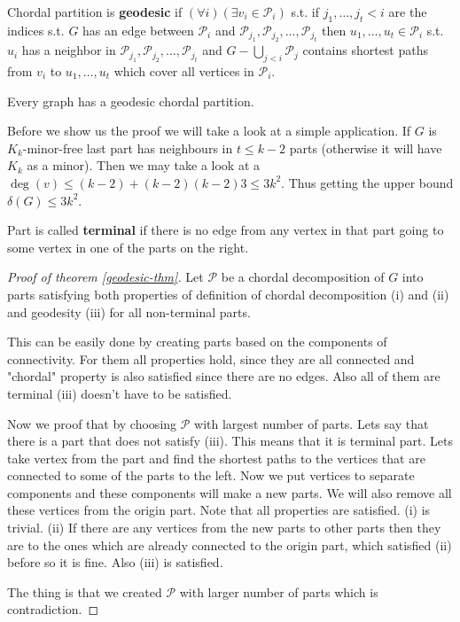 \begin{defn}
	Chordal partition is \textbf{geodesic} if $(\forall i) (\exists v_{i} \in \mathcal{P}_{i})$ s.t. if $j_{1}, \dots, j_{t} < i$ are the indices s.t. $G$ has an edge between $\mathcal{P}_{i}$ and $\mathcal{P}_{j_{1}}, \mathcal{P}_{j_{2}}, \dots, \mathcal{P}_{j_{t}}$ then $u_{1}, \dots, u_{t} \in \mathcal{P}_{i}$ s.t. $u_{i}$ has a neighbor in $\mathcal{P}_{j_{1}}, \mathcal{P}_{j_{2}}, \dots, \mathcal{P}_{j_{t}}$ and $G - \bigcup_{j < i} \mathcal{P}_{j}$ contains shortest paths from $v_{i}$ to $u_{1}, \dots, u_{t}$ which cover all vertices in $\mathcal{P}_{i}$.
\end{defn}


\begin{thm}
	Every graph has a geodesic chordal partition.
	\label{geodesic-thm}
\end{thm}

Before we show us the proof we will take a look at a simple application. If $G$ is $K_{k}$-minor-free last part has neighbours in $t \leq k-2$ parts (otherwise it will have $K_{k}$ as a minor). Then we may take a look at a $\deg(v) \leq (k-2) + (k-2)(k-2)3 \leq 3k^{2}$. Thus getting the upper bound $\delta(G) \leq 3k^{2}$.

\begin{defn}
	Part is called \textbf{terminal} if there is no edge from any vertex in that part going to some vertex in one of the parts on the right.
\end{defn}

\begin{proof}[Proof of theorem \ref{geodesic-thm}]
	Let $\mathcal{P}$ be a chordal decomposition of $G$ into parts satisfying both properties of definition of chordal decomposition (i) and (ii) and geodesity (iii) for all non-terminal parts.
	
	This can be easily done by creating parts based on the components of connectivity. For them all properties hold, since they are all connected and "chordal" property is also satisfied since there are no edges. Also all of them are terminal (iii) doesn't have to be satisfied.
	
	Now we proof that by choosing $\mathcal{P}$ with largest number of parts. Lets say that there is a part that does not satisfy (iii). This means that it is terminal part. Lets take vertex from the part and find the shortest paths to the vertices that are connected to some of the parts to the left. Now we put vertices to separate components and these components will make a new parts. We will also remove all these vertices from the origin part. Note that all properties are satisfied. (i) is trivial. (ii) If there are any vertices from the new parts to other parts then they are to the ones which are already connected to the origin part, which satisfied (ii) before so it is fine. Also (iii) is satisfied.
	
	The thing is that we created $\mathcal{P}$ with larger number of parts which is contradiction.
\end{proof}

